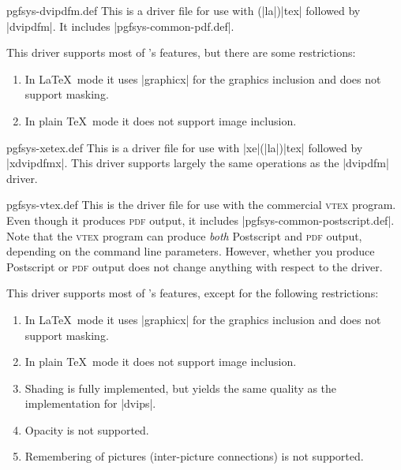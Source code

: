 \begin{filedescription}{pgfsys-dvipdfm.def}
    This is a driver file for use with (|la|)|tex| followed by |dvipdfm|. It
    includes |pgfsys-common-pdf.def|.

    This driver supports most of \pgfname's features, but there are some
    restrictions:
    \begin{enumerate}
        \item In \LaTeX\ mode it uses |graphicx| for the graphics inclusion
            and does not support masking.
        \item In plain \TeX\ mode it does not support image inclusion.
    \end{enumerate}
\end{filedescription}

\begin{filedescription}{pgfsys-xetex.def}
    This is a driver file for use with |xe|(|la|)|tex| followed by |xdvipdfmx|.
    This driver supports largely the same operations as the |dvipdfm| driver.
\end{filedescription}

\begin{filedescription}{pgfsys-vtex.def}
    This is the driver file for use with the commercial \textsc{vtex} program.
    Even though it produces \textsc{pdf} output, it includes
    |pgfsys-common-postscript.def|. Note that the \textsc{vtex} program can
    produce \emph{both} Postscript and \textsc{pdf} output, depending on the
    command line parameters. However, whether you produce Postscript or
    \textsc{pdf} output does not change anything with respect to the driver.

    This driver supports most of \pgfname's features, except for the following
    restrictions:
    \begin{enumerate}
        \item In \LaTeX\ mode it uses |graphicx| for the graphics inclusion
            and does not support masking.
        \item In plain \TeX\ mode it does not support image inclusion.
        \item Shading is fully implemented, but yields the same quality as
            the implementation for |dvips|.
        \item Opacity is not supported.
        \item Remembering of pictures (inter-picture connections) is not
            supported.
    \end{enumerate}
\end{filedescription}

